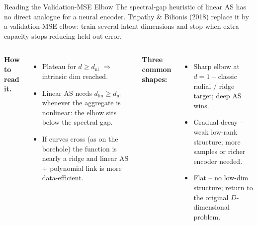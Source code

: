 \documentclass[aspectratio=169,11pt]{beamer}
\newcommand{\emphc}[1]{\textcolor{harvardcrimson}{#1}}
\begin{document}
\begin{frame}[shrink=5]{Reading the Validation-MSE Elbow}
\scriptsize
The spectral-gap heuristic of linear AS has no direct analogue for a neural encoder.  Tripathy \& Bilionis (2018) replace it by a \emphc{validation-MSE elbow}: train several latent dimensions and stop when extra capacity stops reducing held-out error.

\vspace{0.3em}
\begin{columns}[T]
\textbf{How to read it.}
\begin{itemize}\itemsep1pt
  \item Plateau for $d \ge d_{\mathrm{nl}}$ $\Rightarrow$ intrinsic dim reached.
  \item Linear AS needs $d_{\mathrm{lin}} \ge d_{\mathrm{nl}}$ whenever the aggregate is nonlinear: the elbow sits \emphc{below} the spectral gap.
  \item If curves cross (as on the borehole) the function is nearly a ridge and linear AS + polynomial link is more data-efficient.
\end{itemize}

\vspace{0.2em}
\textbf{Three common shapes:}
\begin{itemize}\itemsep1pt
  \item \emphc{Sharp elbow at $d = 1$} -- classic radial / ridge target; deep AS wins.
  \item \emphc{Gradual decay} -- weak low-rank structure; more samples or richer encoder needed.
  \item \emphc{Flat} -- no low-dim structure; return to the original $D$-dimensional problem.
\end{itemize}


\end{columns}
\end{frame}
\end{document}
